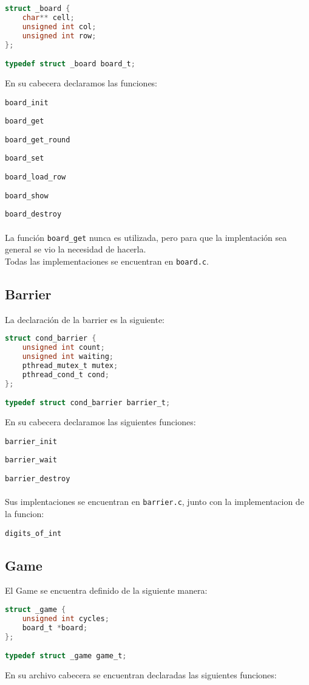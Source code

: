 \documentclass[]{article}
\begin{document}
\begin{lstlisting}[language=C]
struct _board {
	char** cell;
	unsigned int col;
	unsigned int row;
};

typedef struct _board board_t;
\end{lstlisting}
En su cabecera declaramos las funciones:

\verb|board_init|

\verb|board_get|

\verb|board_get_round|

\verb|board_set|

\verb|board_load_row|

\verb|board_show|

\verb|board_destroy|
\\\\
La función \verb|board_get| nunca es utilizada, pero para que la implentación sea general se vio la necesidad de hacerla.\\
Todas las implementaciones se encuentran en \verb|board.c|.
\subsection{Barrier}
La declaración de la barrier es la siguiente:

\begin{lstlisting}[language=C]
struct cond_barrier {
	unsigned int count;
	unsigned int waiting;
	pthread_mutex_t mutex;
	pthread_cond_t cond;
};

typedef struct cond_barrier barrier_t;
\end{lstlisting}
En su cabecera declaramos las siguientes funciones:

\verb|barrier_init|

\verb|barrier_wait|

\verb|barrier_destroy|\\\\
Sus implentaciones se encuentran en \verb|barrier.c|, junto con la implementacion de la funcion:

\verb|digits_of_int|

\newpage
\subsection{Game}
El Game se encuentra definido de la siguiente manera:

\begin{lstlisting}[language=C]
struct _game {
	unsigned int cycles;
	board_t *board;
};

typedef struct _game game_t;
\end{lstlisting}
En su archivo cabecera se encuentran declaradas las siguientes funciones:
\end{document}
